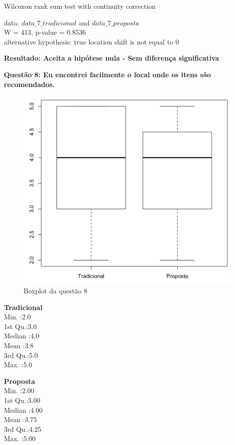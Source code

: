 Wilcoxon rank sum test with continuity correction

\noindent
data:  $data\_7\_tradicional$ and $data\_7\_proposta$\\
W = 413, p-value = 0.8536\\
alternative hypothesis: true location shift is not equal to 0

\textbf{Resultado: Aceita a hipótese nula - Sem diferença significativa}

\newpage
\textbf{Questão 8: Eu encontrei facilmente o local onde os itens são recomendados.}

\begin{figure}[htb]
  \caption{\label{fig:questao8-boxplot}Boxplot da questão 8}
  \begin{center}
      \includegraphics[scale=0.4]{./Figuras/questao8-boxplot.png}
  \end{center}
\end{figure}

\begin{multicols}{2}

\noindent\textbf{Tradicional}\\
Min.   :2.0\\
1st Qu.:3.0\\
Median :4.0\\
Mean   :3.8\\
3rd Qu.:5.0\\
Max.   :5.0\\
\columnbreak

\noindent\textbf{Proposta}\\
Min.   :2.00\\
1st Qu.:3.00\\
Median :4.00\\
Mean   :3.75\\
3rd Qu.:4.25\\
Max.   :5.00
\end{multicols}

